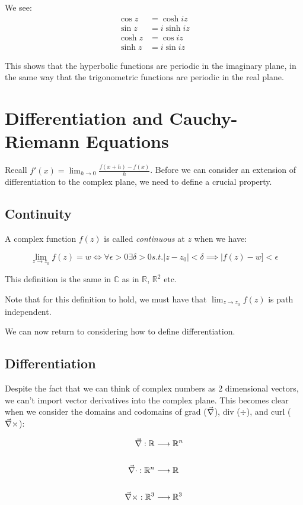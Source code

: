 \documentclass{../../physics_notes}
\begin{document}
We see:
\begin{align}
\cos{z} &= \cosh{iz} \\
\sin{z} &= i\sinh{iz} \\
\cosh{z} &= \cos{iz} \\
\sinh{z} &= i\sin{iz}
\end{align}

This shows that the hyperbolic functions are periodic in the imaginary plane, in the same way that the trigonometric functions are periodic in the real plane. 

\section{Differentiation and Cauchy-Riemann Equations}
Recall $f'(x) = \lim_{h\to 0} \frac{f(x + h) - f(x)}{h}$. Before we can consider an extension of differentiation to the complex plane, we need to define a crucial property.

\subsection{Continuity}

A complex function $f(z)$ is called \emph{continuous} at $z$ when we have:

\[ \lim_{z\to z_0} f(z) = w \iff \forall \epsilon > 0 \exists \delta > 0 s.t. |z - z_0| < \delta \implies |f(z) - w] < \epsilon \]

This definition is the same in $\mathbb{C}$ as in $\mathbb{R}$, $\mathbb{R}^2$ etc. 

Note that for this definition to hold, we must have that $\lim_{z\to z_0} f(z)$ is path independent. 

We can now return to considering how to define differentiation.

\subsection{Differentiation }

Despite the fact that we can think of complex numbers as 2 dimensional vectors, we can't import vector derivatives into the complex plane. This becomes clear when we consider the domains and codomains of grad ($\vec{\nabla}$), div ($\div$), and curl ($\vec{\nabla} \times$):

\begin{align*}
\vec{\nabla}: \mathbb{R} &\longrightarrow \mathbb{R}^n \\
&\\
\vec{\nabla} \cdot: \mathbb{R}^n &\longrightarrow \mathbb{R} \\
&\\
\vec{\nabla} \times: \mathbb{R}^3 &\longrightarrow \mathbb{R}^3 
\end{align*}
\end{document}
